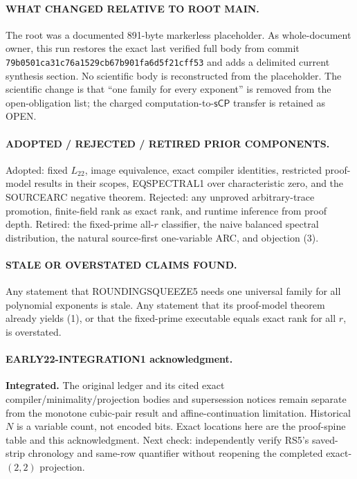 \documentclass[11pt]{article}
\newcommand{\Ltwo}{L_{22}}
\newcommand{\sCP}{\mathsf{sCP}}
\begin{document}
\paragraph{WHAT CHANGED RELATIVE TO ROOT MAIN.}
The root was a documented 891-byte markerless placeholder. As whole-document
owner, this run restores the exact last verified full body from commit
\texttt{79b0501ca31c76a1529cb67b901fa6d5f21cff53} and adds a delimited current
synthesis section. No scientific body is reconstructed from the placeholder.
The scientific change is that ``one family for every exponent'' is removed
from the open-obligation list; the charged computation-to-$\sCP$ transfer is
retained as OPEN.

\paragraph{ADOPTED / REJECTED / RETIRED PRIOR COMPONENTS.}
Adopted: fixed $\Ltwo$, image equivalence, exact compiler identities,
restricted proof-model results in their scopes, EQSPECTRAL1 over
characteristic zero, and the SOURCEARC negative theorem. Rejected: any
unproved arbitrary-trace promotion, finite-field rank as exact rank, and
runtime inference from proof depth. Retired: the fixed-prime all-$r$
classifier, the naive balanced spectral distribution, the natural
source-first one-variable ARC, and objection (3).

\paragraph{STALE OR OVERSTATED CLAIMS FOUND.}
Any statement that ROUNDINGSQUEEZE5 needs one universal family for all
polynomial exponents is stale. Any statement that its proof-model theorem
already yields (1), or that the fixed-prime executable equals exact rank for
all $r$, is overstated.

\paragraph{EARLY22-INTEGRATION1 acknowledgment.}
\textbf{Integrated.} The original ledger and its cited exact
compiler/minimality/projection bodies and supersession notices remain
separate from the monotone cubic-pair result and affine-continuation
limitation. Historical $N$ is a variable count, not encoded bits. Exact
locations here are the proof-spine table and this acknowledgment. Next
check: independently verify RS5's saved-strip chronology and same-row
quantifier without reopening the completed exact-$(2,2)$ projection.
\end{document}

